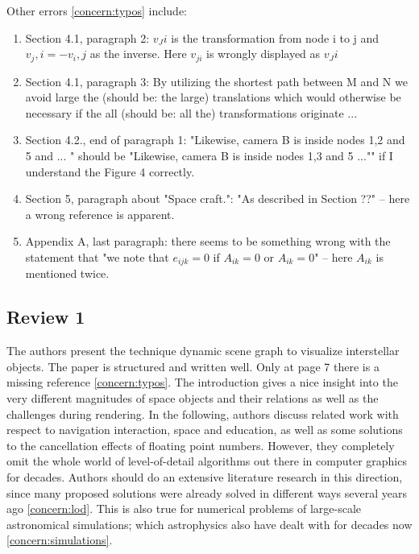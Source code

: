 \documentclass{article}
\begin{document}
Other errors \eqref{concern:typos} include:

\begin{enumerate}
\item Section 4.1, paragraph 2: $v_Ji$ is the transformation from node i to j and $v_j,i=-v_i,j$ as the inverse.
Here $v_{ji}$ is wrongly displayed as $v_Ji$
\item Section 4.1, paragraph 3: By utilizing the shortest path between M and N we avoid large the (should be: the large) translations which would otherwise be necessary if the all (should be: all the) transformations originate ...
\item Section 4.2., end of paragraph 1: "Likewise, camera B is inside nodes 1,2 and 5 and ...
" should be "Likewise, camera B is inside nodes 1,3 and 5 ..."" if I understand the Figure 4 correctly.
\item Section 5, paragraph about "Space craft.": "As described in Section ??" -- here a wrong reference is apparent.
\item Appendix A, last paragraph: there seems to be something wrong with the statement that "we note that $e_{ijk}=0$ if $A_{ik}=0$ or $A_{ik}=0$" -- here $A_{ik}$ is mentioned twice.
\end{enumerate}

\subsection*{Review 1}

The authors present the technique dynamic scene graph to visualize interstellar objects.
The paper is structured and written well.
Only at page 7 there is a missing reference \eqref{concern:typos}.
The introduction gives a nice insight into the very different magnitudes of space objects and their relations as well as the challenges during rendering.
In the following, authors discuss related work with respect to navigation interaction, space and education, as well as some solutions to the cancellation effects of floating point numbers.
However, they completely omit the whole world of level-of-detail algorithms out there in computer graphics for decades.
Authors should do an extensive literature research in this direction, since many proposed solutions were already solved in different ways several years ago \eqref{concern:lod}. 
This is also true for numerical problems of large-scale astronomical simulations; which astrophysics also have dealt with for decades now \eqref{concern:simulations}. 
\end{document}
